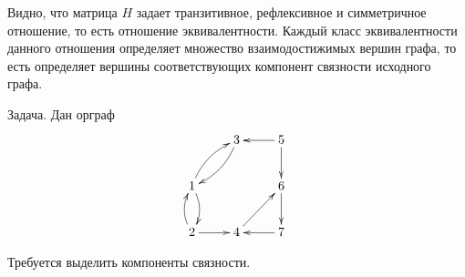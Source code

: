 Видно, что матрица $H$ задает транзитивное, рефлексивное и симметричное отношение, то есть отношение эквивалентности. Каждый класс эквивалентности данного отношения определяет множество взаимодостижимых вершин графа, то есть определяет вершины соответствующих компонент связности исходного графа.
\begin{exampl} 
    Задача. Дан орграф
    \[
        {\xymatrix{
            *{}
                &3 \ar@{->}@/^/[dl]
                    &5 \ar@{->}[l] \ar@{->}[d]
                        \\
            1 \ar@{->}@/^/[ur] \ar@{->}@/^/[d]
                &*{}
                    &6 \ar@{->}[d]
                        \\
            2 \ar@{->}@/^/[u] \ar@{->}[r]
                &4 \ar@{->}[ur]
                    &7 \ar@{->}[l]
        }}        
    \]
    
    Требуется выделить компоненты связности.
\end{exampl}
